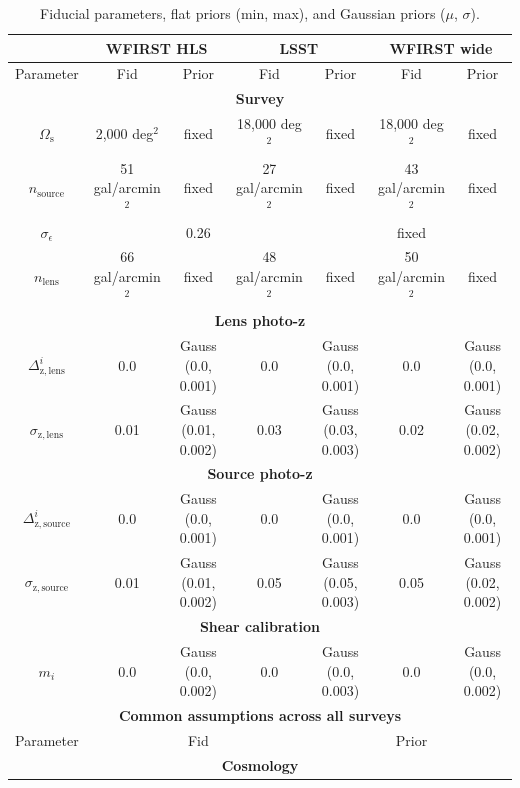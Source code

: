 \documentclass[fleqn,usenatbib,useAMS]{mnras}
\newcommand{\tbf}{\textbf}
\newcommand{\mr}{\mathrm}
\begin{document}
\label{sec:like}
\renewcommand{\arraystretch}{1.3}
\begin{table}
\caption{Fiducial parameters, flat priors (min, max), and Gaussian priors ($\mu$, $\sigma$).}
\begin{center}
\begin{tabular*}{0.95\textwidth}{@{\extracolsep{\fill}}| c c c c c c c |}
\hline
 & \multicolumn{2}{|c}{\tbf{WFIRST HLS}} & \multicolumn{2}{|c}{\tbf{LSST}} & \multicolumn{2}{|c|}{\tbf{WFIRST wide}} \\  
\hline
Parameter & Fid & Prior & Fid & Prior & Fid & Prior \\  
\hline 
\multicolumn{7}{|c|}{\tbf{Survey}} \\
$\Omega_{\mathrm{s}}$ & 2,000 deg$^2$ & fixed & 18,000 deg$^2$ & fixed & 18,000 deg$^2$ & fixed\\
$n_{\mathrm{source}}$ & 51 gal/arcmin$^2$ & fixed & 27 gal/arcmin$^2$ & fixed & 43 gal/arcmin$^2$ & fixed\\
$\sigma_\epsilon$ & \multicolumn{3}{c}{0.26}&  \multicolumn{3}{c|}{fixed} \\
$n_{\mathrm{lens}}$ & 66 gal/arcmin$^2$ & fixed & 48 gal/arcmin$^2$ & fixed & 50 gal/arcmin$^2$ & fixed\\
\hline
\multicolumn{7}{|c|}{\tbf{Lens photo-z }} \\
$\Delta_\mr{z,lens}^i $ & 0.0 &  Gauss (0.0, 0.001)  & 0.0 &  Gauss (0.0, 0.001)  & 0.0 &  Gauss (0.0, 0.001) \\
$\sigma_\mr{z,lens} $ & 0.01 & Gauss (0.01, 0.002) & 0.03 & Gauss (0.03, 0.003) & 0.02 & Gauss (0.02, 0.002) \\
\hline
 \multicolumn{7}{|c|}{\tbf{Source photo-z}} \\
$\Delta_\mr{z,source}^i $ & 0.0 &  Gauss (0.0, 0.001) & 0.0 &  Gauss (0.0, 0.001) & 0.0 &  Gauss (0.0, 0.001) \\
$\sigma_\mr{z,source}$ &0.01 & Gauss (0.01, 0.002) &0.05 & Gauss (0.05, 0.003) &0.05 & Gauss (0.02, 0.002) \\
\hline
 \multicolumn{7}{|c|}{\tbf{Shear calibration}} \\
$m_i $ & 0.0 & Gauss (0.0, 0.002) & 0.0 & Gauss (0.0, 0.003) & 0.0 & Gauss (0.0, 0.002)\\
\hline 
\hline 
 \multicolumn{7}{|c|}{\tbf{ Common assumptions across all surveys}} \\
\hline
Parameter & \multicolumn{3}{c}{Fid} & \multicolumn{3}{c|}{Prior}  \\  
\hline
\multicolumn{7}{|c|}{\tbf{Cosmology}} \\

\end{tabular*}
\end{center}
\end{table}
\end{document}
